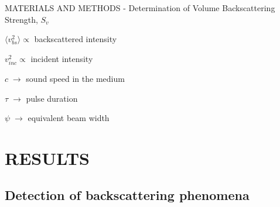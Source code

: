 \documentclass[handout]{beamer}
\begin{document}
\begin{frame}{MATERIALS AND METHODS - Determination of Volume Backscattering Strength, $S_v$}
\begin{minipage}[c]{1\linewidth}
\begin{minipage}[c]{0.55\linewidth}
{\hspace{2pc}$\langle v_{bs}^2 \rangle \propto$ backscattered intensity

\hspace{2pc}$v_{inc}^2 \propto$ incident intensity

\hspace{2pc}$c \;\rightarrow$  sound speed in the medium

\hspace{2pc}$\tau \;\rightarrow$ pulse duration

\hspace{2pc}$\psi \;\rightarrow$ equivalent beam width
}


\end{minipage}
\end{minipage}

\end{frame}

\section{RESULTS}
\subsection{Detection of backscattering phenomena}
\end{document}
